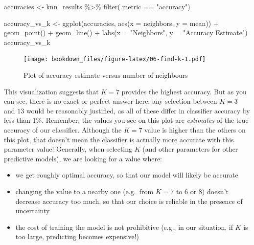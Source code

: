 \documentclass[
]{krantz}
\makeatletter
\newenvironment{Shaded}{\begin{snugshade}}{\end{snugshade}}
\newcommand{\AttributeTok}[1]{\textcolor[rgb]{0.61,0.61,0.61}{#1}}
\newcommand{\FunctionTok}[1]{\textcolor[rgb]{0,0,0}{#1}}
\newcommand{\NormalTok}[1]{#1}
\newcommand{\OtherTok}[1]{\textcolor[rgb]{0.37,0.37,0.37}{#1}}
\newcommand{\SpecialCharTok}[1]{\textcolor[rgb]{0,0,0}{#1}}
\newcommand{\StringTok}[1]{\textcolor[rgb]{0.5,0.5,0.5}{#1}}
\providecommand{\tightlist}{%
  \setlength{\itemsep}{0pt}\setlength{\parskip}{0pt}}
\newenvironment{kframe}{%
\medskip{}
\setlength{\fboxsep}{.8em}
 \def\at@end@of@kframe{}%
 \ifinner\ifhmode%
  \def\at@end@of@kframe{\end{minipage}}%
  \begin{minipage}{\columnwidth}%
 \fi\fi%
 \def\FrameCommand##1{\hskip\@totalleftmargin \hskip-\fboxsep
 \colorbox{shadecolor}{##1}\hskip-\fboxsep
     \hskip-\linewidth \hskip-\@totalleftmargin \hskip\columnwidth}%
 \MakeFramed {\advance\hsize-\width
   \@totalleftmargin\z@ \linewidth\hsize
   \@setminipage}}%
 {\par\unskip\endMakeFramed%
 \at@end@of@kframe}
\renewenvironment{Shaded}{\begin{kframe}}{\end{kframe}}
\makeatother
\begin{document}
\begin{Shaded}
\begin{Highlighting}[]
\NormalTok{accuracies }\OtherTok{\textless{}{-}}\NormalTok{ knn\_results }\SpecialCharTok{\%\textgreater{}\%}
  \FunctionTok{filter}\NormalTok{(.metric }\SpecialCharTok{==} \StringTok{"accuracy"}\NormalTok{)}

\NormalTok{accuracy\_vs\_k }\OtherTok{\textless{}{-}} \FunctionTok{ggplot}\NormalTok{(accuracies, }\FunctionTok{aes}\NormalTok{(}\AttributeTok{x =}\NormalTok{ neighbors, }\AttributeTok{y =}\NormalTok{ mean)) }\SpecialCharTok{+}
  \FunctionTok{geom\_point}\NormalTok{() }\SpecialCharTok{+}
  \FunctionTok{geom\_line}\NormalTok{() }\SpecialCharTok{+}
  \FunctionTok{labs}\NormalTok{(}\AttributeTok{x =} \StringTok{"Neighbors"}\NormalTok{, }\AttributeTok{y =} \StringTok{"Accuracy Estimate"}\NormalTok{)}
\NormalTok{accuracy\_vs\_k}
\end{Highlighting}
\end{Shaded}

\begin{figure}
\centering
\texttt{[image: bookdown\_files/figure-latex/06-find-k-1.pdf]}
\caption{\label{fig:06-find-k}Plot of accuracy estimate versus number of neighbours}
\end{figure}

This visualization suggests that \(K = 7\) provides the highest accuracy.
But as you can see, there is no exact or perfect answer here;
any selection between \(K = 3\) and \(13\) would be reasonably justified, as all
of these differ in classifier accuracy by less than 1\%. Remember: the
values you see on this plot are \emph{estimates} of the true accuracy of our
classifier. Although the \(K=7\) value is higher than the others on this plot,
that doesn't mean the classifier is actually more accurate with this parameter
value! Generally, when selecting \(K\) (and other parameters for other predictive
models), we are looking for a value where:

\begin{itemize}
\tightlist
\item
  we get roughly optimal accuracy, so that our model will likely be accurate
\item
  changing the value to a nearby one (e.g.~from \(K=7\) to 6 or 8) doesn't decrease accuracy too much, so that our choice is reliable in the presence of uncertainty
\item
  the cost of training the model is not prohibitive (e.g., in our situation, if \(K\) is too large, predicting becomes expensive!)
\end{itemize}
\end{document}
